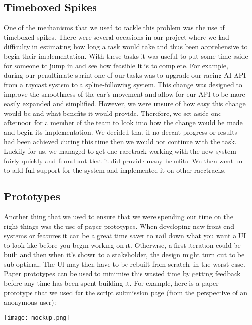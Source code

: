 \subsection{Timeboxed Spikes}
One of the mechanisms that we used to tackle this problem was the use of timeboxed spikes. There were several occasions in our project where we had difficulty in estimating how long a task would take and thus been apprehensive to begin their implementation. With these tasks it was useful to put some time aside for someone to jump in and see how feasible it is to complete. For example, during our penultimate sprint one of our tasks was to upgrade our racing AI API from a raycast system to a spline-following system. This change was designed to improve the smoothness of the car's movement and allow for our API to be more easily expanded and simplified. However, we were unsure of how easy this change would be and what benefits it would provide. Therefore, we set aside one afternoon for a member of the team to look into how the change would be made and begin its implementation. We decided that if no decent progress or results had been achieved during this time then we would not continue with the task. Luckily for us, we managed to get one racetrack working with the new system fairly quickly and found out that it did provide many benefits. We then went on to add full support for the system and implemented it on other racetracks.

\subsection{Prototypes}
Another thing that we used to ensure that we were spending our time on the right things was the use of paper prototypes. When developing new front end systems or features it can be a great time saver to nail down what you want a UI to look like before you begin working on it. Otherwise, a first iteration could be built and then when it's shown to a stakeholder, the design might turn out to be sub-optimal. The UI may then have to be rebuilt from scratch, in the worst case. Paper prototypes can be used to minimise this wasted time by getting feedback before any time has been spent building it. For example, here is a paper prototype that we used for the script submission page (from the perspective of an anonymous user):

\begin{center}
\texttt{[image: mockup.png]}
\end{center}

